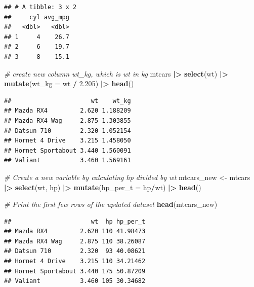 \documentclass[
  12pt,
  oneside]{book}
\newenvironment{Shaded}{\begin{snugshade}}{\end{snugshade}}
\newcommand{\AttributeTok}[1]{\textcolor[rgb]{0.13,0.29,0.53}{#1}}
\newcommand{\CommentTok}[1]{\textcolor[rgb]{0.56,0.35,0.01}{\textit{#1}}}
\newcommand{\FloatTok}[1]{\textcolor[rgb]{0.00,0.00,0.81}{#1}}
\newcommand{\FunctionTok}[1]{\textcolor[rgb]{0.13,0.29,0.53}{\textbf{#1}}}
\newcommand{\NormalTok}[1]{#1}
\newcommand{\OtherTok}[1]{\textcolor[rgb]{0.56,0.35,0.01}{#1}}
\newcommand{\SpecialCharTok}[1]{\textcolor[rgb]{0.81,0.36,0.00}{\textbf{#1}}}
\theoremstyle{definition}
\theoremstyle{definition}
\theoremstyle{definition}
\theoremstyle{definition}
\theoremstyle{remark}
\begin{document}
\begin{verbatim}
## # A tibble: 3 x 2
##     cyl avg_mpg
##   <dbl>   <dbl>
## 1     4    26.7
## 2     6    19.7
## 3     8    15.1
\end{verbatim}

\begin{Shaded}
\begin{Highlighting}[]
\CommentTok{\# create new column wt\_kg, which is wt in kg}
\NormalTok{mtcars }\SpecialCharTok{|\textgreater{}} 
  \FunctionTok{select}\NormalTok{(wt) }\SpecialCharTok{|\textgreater{}} 
  \FunctionTok{mutate}\NormalTok{(}\AttributeTok{wt\_kg =}\NormalTok{ wt }\SpecialCharTok{/} \FloatTok{2.205}\NormalTok{) }\SpecialCharTok{|\textgreater{}} 
  \FunctionTok{head}\NormalTok{()}
\end{Highlighting}
\end{Shaded}

\begin{verbatim}
##                      wt    wt_kg
## Mazda RX4         2.620 1.188209
## Mazda RX4 Wag     2.875 1.303855
## Datsun 710        2.320 1.052154
## Hornet 4 Drive    3.215 1.458050
## Hornet Sportabout 3.440 1.560091
## Valiant           3.460 1.569161
\end{verbatim}

\begin{Shaded}
\begin{Highlighting}[]
\CommentTok{\# Create a new variable by calculating hp divided by wt}
\NormalTok{mtcars\_new }\OtherTok{\textless{}{-}}\NormalTok{ mtcars }\SpecialCharTok{|\textgreater{}} 
  \FunctionTok{select}\NormalTok{(wt, hp) }\SpecialCharTok{|\textgreater{}} 
  \FunctionTok{mutate}\NormalTok{(}\AttributeTok{hp\_per\_t =}\NormalTok{ hp}\SpecialCharTok{/}\NormalTok{wt) }\SpecialCharTok{|\textgreater{}} 
  \FunctionTok{head}\NormalTok{()}

\CommentTok{\# Print the first few rows of the updated dataset}
\FunctionTok{head}\NormalTok{(mtcars\_new)}
\end{Highlighting}
\end{Shaded}

\begin{verbatim}
##                      wt  hp hp_per_t
## Mazda RX4         2.620 110 41.98473
## Mazda RX4 Wag     2.875 110 38.26087
## Datsun 710        2.320  93 40.08621
## Hornet 4 Drive    3.215 110 34.21462
## Hornet Sportabout 3.440 175 50.87209
## Valiant           3.460 105 30.34682
\end{verbatim}
\end{document}
